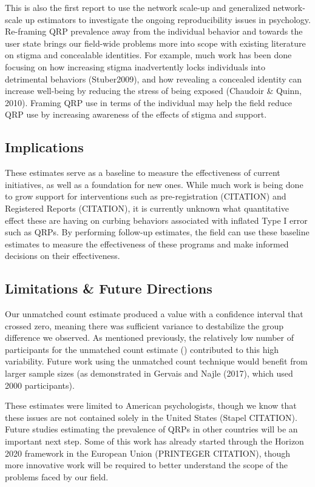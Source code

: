 \documentclass[man]{apa6}
\theoremstyle{definition}
\theoremstyle{definition}
\theoremstyle{definition}
\theoremstyle{remark}
\begin{document}
This is also the first report to use the network scale-up and
generalized network-scale up estimators to investigate the ongoing
reproducibility issues in psychology. Re-framing QRP prevalence away
from the individual behavior and towards the user state brings our
field-wide problems more into scope with existing literature on stigma
and concealable identities. For example, much work has been done
focusing on how increasing stigma inadvertently locks individuals into
detrimental behaviors (Stuber2009), and how revealing a concealed
identity can increase well-being by reducing the stress of being exposed
(Chaudoir \& Quinn, 2010). Framing QRP use in terms of the individual
may help the field reduce QRP use by increasing awareness of the effects
of stigma and support.

\subsection{Implications}\label{implications}

These estimates serve as a baseline to measure the effectiveness of
current initiatives, as well as a foundation for new ones. While much
work is being done to grow support for interventions such as
pre-registration (CITATION) and Registered Reports (CITATION), it is
currently unknown what quantitative effect these are having on curbing
behaviors associated with inflated Type I error such as QRPs. By
performing follow-up estimates, the field can use these baseline
estimates to measure the effectiveness of these programs and make
informed decisions on their effectiveness.

\subsection{Limitations \& Future
Directions}\label{limitations-future-directions}

Our unmatched count estimate produced a value with a confidence interval
that crossed zero, meaning there was sufficient variance to destabilize
the group difference we observed. As mentioned previously, the
relatively low number of participants for the unmatched count estimate
() contributed to this high variability. Future work using the unmatched
count technique would benefit from larger sample sizes (as demonstrated
in Gervais and Najle (2017), which used 2000 participants).

These estimates were limited to American psychologists, though we know
that these issues are not contained solely in the United States (Stapel
CITATION). Future studies estimating the prevalence of QRPs in other
countries will be an important next step. Some of this work has already
started through the Horizon 2020 framework in the European Union
(PRINTEGER CITATION), though more innovative work will be required to
better understand the scope of the problems faced by our field.
\end{document}
